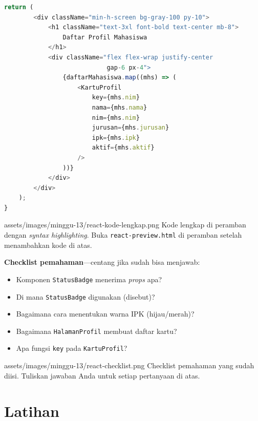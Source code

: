 \begin{lstlisting}[language=JavaScript, caption={Demo lengkap: Halaman Profil Mahasiswa dalam React}, label={lst:13-demo-lengkap}]
    return (
        <div className="min-h-screen bg-gray-100 py-10">
            <h1 className="text-3xl font-bold text-center mb-8">
                Daftar Profil Mahasiswa
            </h1>
            <div className="flex flex-wrap justify-center
                            gap-6 px-4">
                {daftarMahasiswa.map((mhs) => (
                    <KartuProfil
                        key={mhs.nim}
                        nama={mhs.nama}
                        nim={mhs.nim}
                        jurusan={mhs.jurusan}
                        ipk={mhs.ipk}
                        aktif={mhs.aktif}
                    />
                ))}
            </div>
        </div>
    );
}
\end{lstlisting}

\begin{tangkapanlayar}
  {assets/images/minggu-13/react-kode-lengkap.png}
  {Kode lengkap di peramban dengan \emph{syntax highlighting}.}
  {Buka \texttt{react-preview.html} di peramban setelah menambahkan kode di atas.}
\end{tangkapanlayar}

\textbf{Checklist pemahaman}---centang jika sudah bisa menjawab:

\begin{itemize}
  \item[$\square$] Komponen \texttt{StatusBadge} menerima \emph{props} apa?
  \item[$\square$] Di mana \texttt{StatusBadge} digunakan (disebut)?
  \item[$\square$] Bagaimana cara menentukan warna IPK (hijau/merah)?
  \item[$\square$] Bagaimana \texttt{HalamanProfil} membuat daftar kartu?
  \item[$\square$] Apa fungsi \texttt{key} pada \texttt{KartuProfil}?
\end{itemize}

\begin{tangkapanlayar}
  {assets/images/minggu-13/react-checklist.png}
  {Checklist pemahaman yang sudah diisi.}
  {Tuliskan jawaban Anda untuk setiap pertanyaan di atas.}
\end{tangkapanlayar}

\section{Latihan}
\label{sec:13-latihan}


